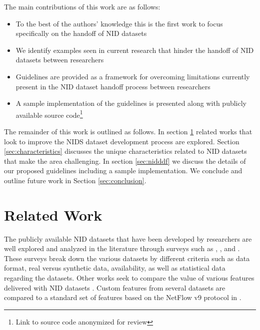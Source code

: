 \documentclass[sigconf, anonymous, screen]{acmart}
\begin{document}
The main contributions of this work are as follows:

\begin{itemize}
    \item To the best of the authors' knowledge this is the first work to focus specifically on the handoff of NID datasets %
    \item We identify examples seen in current research that hinder the handoff of NID datasets between researchers
    \item Guidelines are provided as a framework for overcoming limitations currently present in the NID dataset handoff process between researchers
    \item A sample implementation of the guidelines is presented along with publicly available source code\footnote{Link to source code anonymized for review}
\end{itemize}

The remainder of this work is outlined as follows.
In section \ref{sec:related_work} related works that look to improve the NIDS dataset development process are explored.
Section \ref{sec:characteristics} discusses the unique characteristics related to NID datasets that make the area challenging.
In section \ref{sec:nidddf} we discuss the details of our proposed guidelines including a sample implementation.
We conclude and outline future work in Section \ref{sec:conclusion}.

\section{Related Work}\label{sec:related_work}

The publicly available NID datasets that have been developed by researchers are well explored and analyzed in the literature through surveys such as \cite{Chou2022}, \cite{ring2019survey}, and \cite{yang2022systematic}.
These surveys break down the various datasets by different criteria such as data format, real versus synthetic data, availability, as well as statistical data regarding the datasets.
Other works seek to compare the value of various features delivered with NID datasets \cite{7809531}.
Custom features from several datasets are compared to a standard set of features based on the NetFlow v9 protocol \cite{netflowv9format} in \cite{sarhan2020netflow}.
\end{document}

